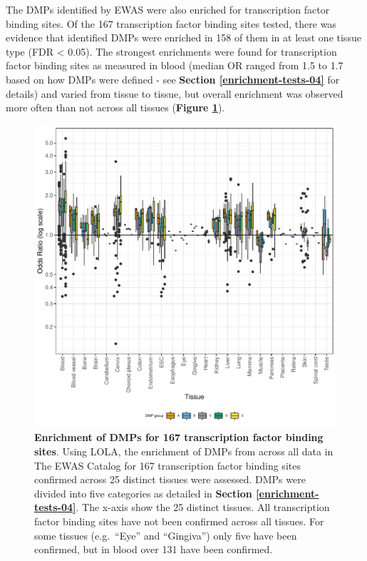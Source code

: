 \documentclass[11pt,twoside]{bristolthesis}
\begin{document}
The DMPs identified by EWAS were also enriched for transcription factor binding sites. Of the 167 transcription factor binding sites tested, there was evidence that identified DMPs were enriched in 158 of them in at least one tissue type (FDR \textless{} 0.05). The strongest enrichments were found for transcription factor binding sites as measured in blood (median OR ranged from 1.5 to 1.7 based on how DMPs were defined - see \textbf{Section \ref{enrichment-tests-04}} for details) and varied from tissue to tissue, but overall enrichment was observed more often than not across all tissues (\textbf{Figure \ref{fig:tfbs-plot}}).




\begin{figure}

{\centering \includegraphics[width=1\linewidth]{figure/04-properties_of_ewas/tfbs_enrichment_plot} 

}

\caption[Enrichment of DMPs for 167 transcription factor binding sites]{\textbf{Enrichment of DMPs for 167 transcription factor binding sites}. Using LOLA, the enrichment of DMPs from across all data in The EWAS Catalog for 167 transcription factor binding sites confirmed across 25 distinct tissues were assessed. DMPs were divided into five categories as detailed in \textbf{Section \ref{enrichment-tests-04}}. The x-axis show the 25 distinct tissues. All transcription factor binding sites have not been confirmed across all tissues. For some tissues (e.g.~``Eye'' and ``Gingiva'') only five have been confirmed, but in blood over 131 have been confirmed.}\label{fig:tfbs-plot}
\end{figure}
\newpage
\end{document}
